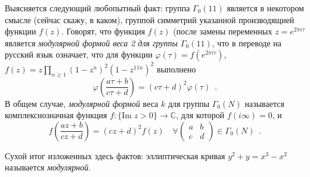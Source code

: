 \documentclass{article}
\theoremstyle{definition}
\newtheorem*{theorem}{Теорема}
\begin{document}
Выясняется следующий любопытный факт: группа \( \Gamma_0(11) \) является в
некотором смысле (сейчас скажу, в каком), группой симметрий указанной
производящией функции \( f(z) \). Говорят, что функция \( f(z) \) (после замены
переменных \( z = e^{2 \pi i \tau} \) является \textit{модулярной формой веса 2
для группы \( \Gamma_0(11) \)}, что в переводе на русский язык означает, что для
функции \( \varphi(\tau) = f(e^{2 \pi i \tau} ) \), \(f(z) = z \prod_{n \geq
1}(1 - z^n)^2 (1 - z^{11 n})^2 \) выполнено
\[
    \varphi\left(
        \dfrac{a\tau + b}{c \tau + d}
    \right)
     = (c \tau + d)^2 \varphi(\tau) \enspace .
\]
В общем случае, \textit{модулярной формой} веса \( k \) для группы \(
\Gamma_0(N) \) называется комплекснозначная функция \( f \colon \{\mathrm{Im}\;
z > 0\} \to \mathbb C \), для которой \(f (i \infty) = 0 \), и
\[
    f\left(
        \dfrac{az + b}{c z + d}
    \right)
     = (c z + d)^2 f(z) \quad \forall \begin{pmatrix}a & b \\ c&d
\end{pmatrix}  \in \Gamma_0(N) \enspace .
\]

Сухой итог изложенных здесь фактов: эллиптическая кривая \( y^2 + y = x^3 - x^2
\) называется \textit{модулярной}.




\end{document}
